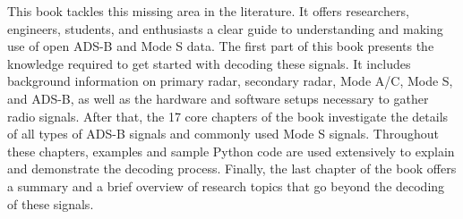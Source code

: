 This book tackles this missing area in the literature. It offers researchers, engineers, students, and enthusiasts a clear guide to understanding and making use of open ADS-B and Mode S data. The first part of this book presents the knowledge required to get started with decoding these signals. It includes background information on primary radar, secondary radar, Mode A/C, Mode S, and ADS-B, as well as the hardware and software setups necessary to gather radio signals. After that, the 17 core chapters of the book investigate the details of all types of ADS-B signals and commonly used Mode S signals. Throughout these chapters, examples and sample Python code are used extensively to explain and demonstrate the decoding process. Finally, the last chapter of the book offers a summary and a brief overview of research topics that go beyond the decoding of these signals.
